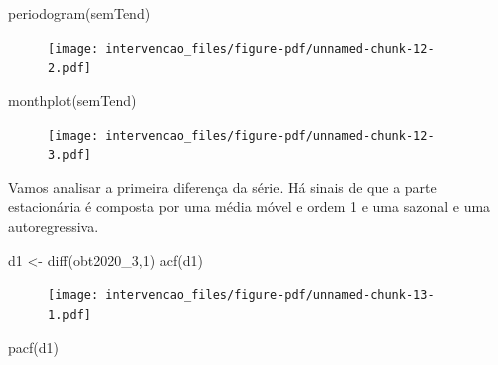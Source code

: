 \documentclass[
  letterpaper,
  DIV=11,
  numbers=noendperiod]{scrartcl}
\newenvironment{Shaded}{\begin{snugshade}}{\end{snugshade}}
\newcommand{\DecValTok}[1]{\textcolor[rgb]{0.68,0.00,0.00}{#1}}
\newcommand{\FunctionTok}[1]{\textcolor[rgb]{0.28,0.35,0.67}{#1}}
\newcommand{\NormalTok}[1]{\textcolor[rgb]{0.00,0.23,0.31}{#1}}
\newcommand{\OtherTok}[1]{\textcolor[rgb]{0.00,0.23,0.31}{#1}}
\theoremstyle{plain}
\theoremstyle{plain}
\theoremstyle{definition}
\theoremstyle{definition}
\theoremstyle{remark}
\begin{document}
\begin{Shaded}
\begin{Highlighting}[]
\FunctionTok{periodogram}\NormalTok{(semTend)}
\end{Highlighting}
\end{Shaded}

\begin{figure}[H]

{\centering \texttt{[image: intervencao\_files/figure-pdf/unnamed-chunk-12-2.pdf]}

}

\end{figure}

\begin{Shaded}
\begin{Highlighting}[]
\FunctionTok{monthplot}\NormalTok{(semTend)}
\end{Highlighting}
\end{Shaded}

\begin{figure}[H]

{\centering \texttt{[image: intervencao\_files/figure-pdf/unnamed-chunk-12-3.pdf]}

}

\end{figure}

Vamos analisar a primeira diferença da série. Há sinais de que a parte
estacionária é composta por uma média móvel e ordem 1 e uma sazonal e
uma autoregressiva.

\begin{Shaded}
\begin{Highlighting}[]
\NormalTok{d1 }\OtherTok{\textless{}{-}} \FunctionTok{diff}\NormalTok{(obt2020\_3,}\DecValTok{1}\NormalTok{)}
\FunctionTok{acf}\NormalTok{(d1)}
\end{Highlighting}
\end{Shaded}

\begin{figure}[H]

{\centering \texttt{[image: intervencao\_files/figure-pdf/unnamed-chunk-13-1.pdf]}

}

\end{figure}

\begin{Shaded}
\begin{Highlighting}[]
\FunctionTok{pacf}\NormalTok{(d1)}
\end{Highlighting}
\end{Shaded}
\end{document}
